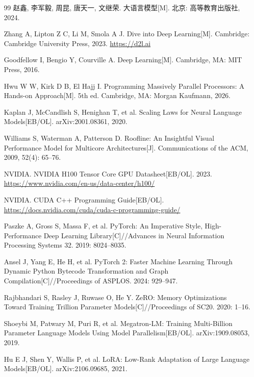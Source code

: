 \documentclass{article}
\begin{document}
\begin{thebibliography}{99}
 赵鑫, 李军毅, 周昆, 唐天一, 文继荣. 大语言模型[M]. 北京: 高等教育出版社, 2024.

 Zhang A, Lipton Z C, Li M, Smola A J. Dive into Deep Learning[M]. Cambridge: Cambridge University Press, 2023. \url{https://d2l.ai}

 Goodfellow I, Bengio Y, Courville A. Deep Learning[M]. Cambridge, MA: MIT Press, 2016.

 Hwu W W, Kirk D B, El Hajj I. Programming Massively Parallel Processors: A Hands-on Approach[M]. 5th ed. Cambridge, MA: Morgan Kaufmann, 2026.

 Kaplan J, McCandlish S, Henighan T, et al. Scaling Laws for Neural Language Models[EB/OL]. arXiv:2001.08361, 2020.

 Williams S, Waterman A, Patterson D. Roofline: An Insightful Visual Performance Model for Multicore Architectures[J]. Communications of the ACM, 2009, 52(4): 65--76.

 NVIDIA. NVIDIA H100 Tensor Core GPU Datasheet[EB/OL]. 2023. \url{https://www.nvidia.com/en-us/data-center/h100/}

 NVIDIA. CUDA C++ Programming Guide[EB/OL]. \url{https://docs.nvidia.com/cuda/cuda-c-programming-guide/}

 Paszke A, Gross S, Massa F, et al. PyTorch: An Imperative Style, High-Performance Deep Learning Library[C]//Advances in Neural Information Processing Systems 32. 2019: 8024--8035.

 Ansel J, Yang E, He H, et al. PyTorch 2: Faster Machine Learning Through Dynamic Python Bytecode Transformation and Graph Compilation[C]//Proceedings of ASPLOS. 2024: 929--947.

 Rajbhandari S, Rasley J, Ruwase O, He Y. ZeRO: Memory Optimizations Toward Training Trillion Parameter Models[C]//Proceedings of SC20. 2020: 1--16.

 Shoeybi M, Patwary M, Puri R, et al. Megatron-LM: Training Multi-Billion Parameter Language Models Using Model Parallelism[EB/OL]. arXiv:1909.08053, 2019.

 Hu E J, Shen Y, Wallis P, et al. LoRA: Low-Rank Adaptation of Large Language Models[EB/OL]. arXiv:2106.09685, 2021.


\end{thebibliography}
\end{document}
